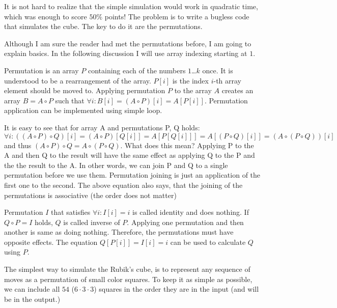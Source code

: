

It is not hard to realize that the simple simulation
would work in quadratic time, which was enough to
score $50\%$ points! The problem is to write a bugless
code that simulates the cube. The key to do it
are the permutations.


Although I am sure the reader had met the permutations before,
I am going to explain basics. 
In the following discussion I will use array indexing
starting at $1$.

\smallskip

Permutation is an array $P$ containing each of the numbers
$1$\dots$k$ once. It is understood to be a rearrangement
of the array. $P[i]$ is the index $i$-th array element should
be moved to. Applying permutation $P$ to the array $A$ creates
an array $B = A \circ P$ such that
$\forall i: B[i] = (A \circ P)[i] = A[P[i]]$.
Permutation application can be implemented using simple loop.

\smallskip

It is easy to see that for array A and permutations P, Q holds:
$$\forall i: ((A \circ P) \circ Q)[i] = (A \circ P)[Q[i]] = A[P[Q[i]]] =
A[(P \circ Q)[i]] = (A \circ (P \circ Q))[i]$$ and thus
$(A \circ P) \circ Q = A \circ (P \circ Q)$.
What does this mean? Applying P to the A and
then Q to the result will have the same effect as
applying Q to the P and the the result to the A.
In other words, we can join P and Q to a single permutation
before we use them. Permutation joining is just
an application of the first one to the second.
The above equation also says, that the joining of the
permutations is associative (the order does not matter)

\smallskip

Permutation $I$ that satisfies $\forall i: I[i] = i$
is called identity and does nothing.
If $Q \circ P = I$ holds, $Q$ is called inverse
of $P$. Applying one permutation and then
another is same as doing nothing. Therefore,
the permutations must have opposite effects.
The equation $Q[P[i]] = I[i] = i$ can be used to
calculate $Q$ using $P$.


The simplest way to simulate the Rubik's cube,
is to represent any sequence of moves as a permutation
of small color squares. To keep it as simple as possible,
we can include all $54$ ($6\cdot3\cdot3$) squares
in the order they are in the input (and will be in
the output.)

